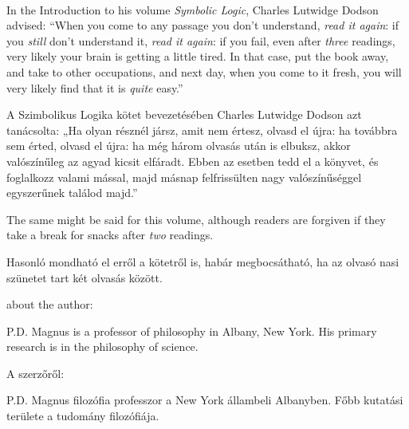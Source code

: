 \thispagestyle{empty}
\onecolumn
\ 
\vfill

\parbox{3 in}{
In the Introduction to his volume \emph{Symbolic Logic}, Charles Lutwidge Dodson advised: ``When you come to any passage you don't understand, \emph{read it again}: if you \emph{still} don't understand it, \emph{read it again}: if you fail, even after \emph{three} readings, very likely your brain is getting a little tired. In that case, put the book away, and take to other occupations, and next day, when you come to it fresh, you will very likely find that it is \emph{quite} easy.''

A Szimbolikus Logika kötet bevezetésében Charles Lutwidge Dodson azt tanácsolta: „Ha olyan résznél jársz, amit nem értesz, olvasd el újra: ha továbbra sem érted, olvasd el újra: ha még három olvasás után is elbuksz, akkor valószínűleg az agyad kicsit elfáradt. Ebben az esetben tedd el a könyvet, és foglalkozz valami mással, majd másnap felfrissülten nagy valószínűséggel egyszerűnek találod majd.”
\medskip

The same might be said for this volume, although readers are forgiven if they take a break for snacks after \emph{two} readings.

Hasonló mondható el erről a kötetről is, habár megbocsátható, ha az olvasó nasi szünetet tart két olvasás között.
}

\vfill

\parbox{3 in}{
{\sf about the author:}
\medskip

P.D. Magnus is a professor of philosophy in Albany, New York. His primary research is in the philosophy of science.

{\sf A szerzőről:}
\medskip

P.D. Magnus filozófia professzor a New York állambeli Albanyben. Főbb kutatási területe a tudomány filozófiája.
}
\vfill

